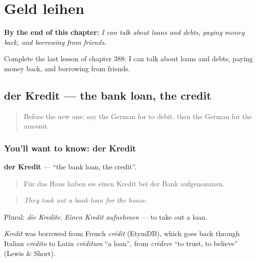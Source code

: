 
\chapter{Geld leihen}
\label{ch:ge-geld-leihen}

\begin{chapteropening}
\textbf{By the end of this chapter:} \emph{I can talk about loans and debts, paying money back, and borrowing from friends.}

Complete the last lesson of chapter 388: I can talk about loans and debts, paying money back, and borrowing from friends.
\end{chapteropening}

\section[der Kredit]{der Kredit — the bank loan, the credit}

\label{lesson:GE-C388-kredit}



\begin{quote}
Before the new one: say the German for to debit, then the German for the amount.
\end{quote}

\subsection*{You'll want to know: der Kredit}
\textbf{der Kredit} — \textquotedblleft{}the bank loan, the credit\textquotedblright{}.

\begin{quote}
Für das Haus haben sie einen Kredit bei der Bank aufgenommen.
\end{quote}

\begin{quote}
\emph{They took out a bank loan for the house.}
\end{quote}

Plural: \emph{die Kredite}. \emph{Einen Kredit aufnehmen} — to take out a loan.

\begin{cousinweb}
\emph{Kredit} was borrowed from French \emph{crédit} (EtymDB), which goes back through Italian \emph{credito} to Latin \emph{crēditum} \textquotedblleft{}a loan\textquotedblright{}, from \emph{crēdere} \textquotedblleft{}to trust, to believe\textquotedblright{} (Lewis \& Short).
\end{cousinweb}

